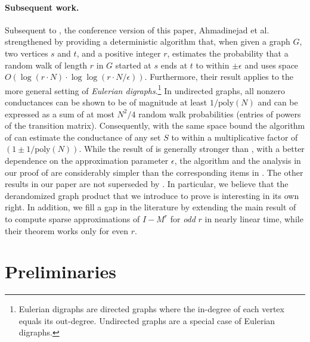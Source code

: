 \documentclass{toc}
\newcommand{\poly}{\mathrm{poly}}
\numberwithin{myalgctr}{section}
\theoremstyle{named}
\begin{document}
\paragraph{Subsequent work.}
Subsequent to \cite{conf-version}, the conference version of this
paper,  
Ahmadinejad et al.  %
\cite{akmpsv19} strengthened  by providing a deterministic algorithm that, when given a graph $G$, two vertices $s$ and $t$, and a positive integer $r$, estimates the probability that a random walk of length $r$ in $G$ started at $s$ ends at $t$ to within $\pm\epsilon$ and uses space $O(\log (r\cdot N)\cdot\log\log(r\cdot N/\epsilon))$. Furthermore, their result applies to the more general setting of \emph{Eulerian digraphs}.\footnote{Eulerian digraphs are directed graphs where
%
the in-degree of each vertex %
equals its out-degree. Undirected graphs are a special case of Eulerian
%
digraphs.}   %
In undirected graphs, all nonzero conductances can be shown to be of magnitude at least $1/\poly(N)$ and can be expressed as a sum of at most $N^2/4$ random walk probabilities %
%
(entries of powers of the transition matrix). %
Consequently, with the same space bound the algorithm of \cite{akmpsv19} can estimate the conductance of any set $S$ to within a multiplicative factor of $(1\pm 1/\poly(N))$. While the result of \cite{akmpsv19} is generally stronger than , with a better dependence on the approximation parameter $\epsilon$, the algorithm and
the   %
analysis in our proof of 
%
are  %
considerably simpler than
%
the corresponding items in  %
\cite{akmpsv19}. %
%
%
%
The other results in our paper are not superseded by \cite{akmpsv19}. In particular, we believe that the derandomized graph product that we introduce to prove  is interesting in its own right. In addition, we fill a gap in the literature by extending the main result of \cite{cheng2015} to compute sparse approximations of $I-M^r$ for \emph{odd} $r$ in nearly linear time, while their theorem works only for even $r$.

\section{Preliminaries}
\label{sect:prelims}
%
\end{document}
